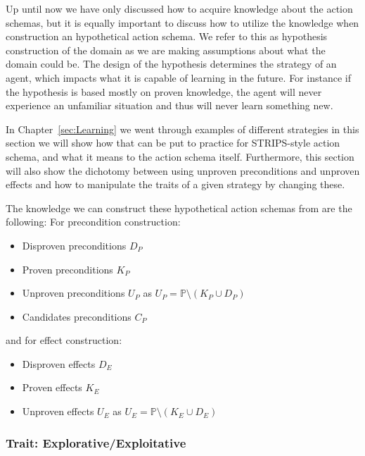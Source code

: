 \documentclass[../Master.tex]{subfiles}
\begin{document}
	Up until now we have only discussed how to acquire knowledge about the action schemas, but it is equally important to discuss how to utilize the knowledge when construction an hypothetical action schema.
	We refer to this as hypothesis construction of the domain as we are making assumptions about what the domain could be.
	The design of the hypothesis determines the strategy of an agent, which impacts what it is capable of learning in the future.
	For instance if the hypothesis is based mostly on proven knowledge, the agent will never experience an unfamiliar situation and thus will never learn something new.

	In Chapter~\ref{sec:Learning} we went through examples of different strategies in this section we will show how that can be put to practice for STRIPS-style action schema, and what it means to the action schema itself.
	Furthermore, this section will also show the dichotomy between using unproven preconditions and unproven effects and how to manipulate the traits of a given strategy by changing these.

	The knowledge we can construct these hypothetical action schemas from are the following: 
	For precondition construction:

	\begin{itemize}
		\item Disproven preconditions $D_P$
		\item Proven preconditions $K_P$
		\item Unproven preconditions $U_P$ as $U_P = \mathbb{P} \setminus (K_P \cup D_P)$
		\item Candidates preconditions $C_P$
	\end{itemize}

	and for effect construction:

	\begin{itemize}
		\item Disproven effects $D_E$
		\item Proven effects $K_E$
		\item Unproven effects $U_E$ as $U_E = \mathbb{P} \setminus (K_E \cup D_E)$
	\end{itemize}

\subsubsection{Trait: Explorative/Exploitative}
\end{document}
